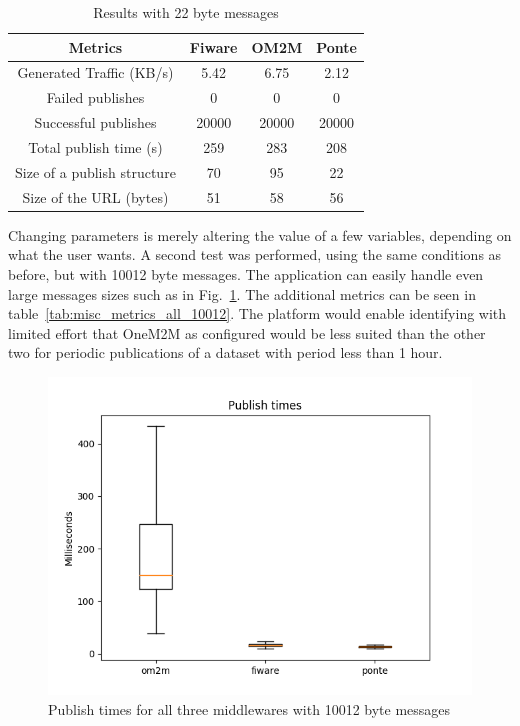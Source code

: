 \documentclass[conference]{IEEEtran}
\begin{document}
\begin{table}[htbp!]
  \centering
  \begin{tabular}{|c|c|c|c|}
    \hline 
    \textbf{Metrics} & \textbf{Fiware} & \textbf{OM2M} & \textbf{Ponte} \\
    \hline 
    Generated Traffic (KB/s) & 5.42 & 6.75 & 2.12 \\
    \hline 
    Failed publishes & 0 & 0 & 0 \\
    \hline 
    Successful publishes & 20000 & 20000 & 20000 \\
    \hline 
    Total publish time (s) & 259 & 283 & 208 \\
    \hline 
    Size of a publish structure & 70 & 95 & 22 \\
    \hline 
    Size of the URL (bytes) & 51 & 58 & 56 \\
    \hline 
    
  \end{tabular}
  \vspace{1mm}
  \caption{Results with 22 byte messages}
  \label{tab:misc_metrics_all_22}
\end{table}

Changing parameters is merely altering the value of a few variables, depending on what the user wants. A second test was performed, using the same conditions as before, but with 10012 byte messages. The application can easily handle even large messages sizes such as in Fig.~\ref{fig:publish_times_10000}. The additional metrics can be seen in table~\ref{tab:misc_metrics_all_10012}. The platform would enable identifying with limited effort that OneM2M as configured would be less suited than the other two for periodic publications of a dataset with period less than 1 hour.

\begin{figure}[htbp!]
  \centering
  \includegraphics[width=\columnwidth]{figures/om2m_fiware_ponte_publish_times_10000.png}
  \caption{Publish times for all three middlewares with 10012 byte messages}
  \label{fig:publish_times_10000}
\end{figure}
\end{document}
